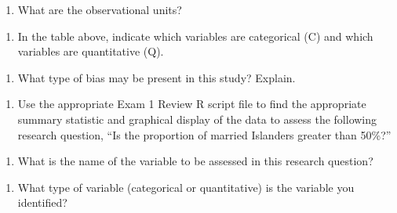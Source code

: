 \documentclass[
]{report}
\providecommand{\tightlist}{%
  \setlength{\itemsep}{0pt}\setlength{\parskip}{0pt}}
\begin{document}
\begin{enumerate}
\def\labelenumi{\arabic{enumi}.}
\tightlist
\item
  What are the observational units?
\end{enumerate}

\vspace{0.1in}

\begin{enumerate}
\def\labelenumi{\arabic{enumi}.}
\setcounter{enumi}{1}
\tightlist
\item
  In the table above, indicate which variables are categorical (C) and which variables are quantitative (Q).
\end{enumerate}

\vspace{0.1in}

\begin{enumerate}
\def\labelenumi{\arabic{enumi}.}
\setcounter{enumi}{2}
\tightlist
\item
  What type of bias may be present in this study? Explain.
\end{enumerate}

\vspace{0.5in}

\begin{enumerate}
\def\labelenumi{\arabic{enumi}.}
\setcounter{enumi}{3}
\tightlist
\item
  Use the appropriate Exam 1 Review R script file to find the appropriate summary statistic and graphical display of the data to assess the following research question, ``Is the proportion of married Islanders greater than 50\%?''
\end{enumerate}

\begin{enumerate}
\def\labelenumi{\alph{enumi}.}
\tightlist
\item
  What is the name of the variable to be assessed in this research question?
\end{enumerate}

\vspace{0.1in}

\begin{enumerate}
\def\labelenumi{\alph{enumi}.}
\setcounter{enumi}{1}
\tightlist
\item
  What type of variable (categorical or quantitative) is the variable you identified?
\end{enumerate}

\vspace{0.1in}
\end{document}
